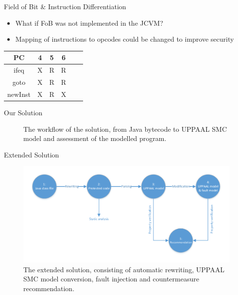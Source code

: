 \begin{frame}[fragile]{Field of Bit \& Instruction Differentiation}
\begin{itemize}
\item What if FoB was not implemented in the JCVM?
\item Mapping of instructions to opcodes could be changed to improve security
\end{itemize}
\begin{table}
\centering
\begin{tabular}{|c|c|c|c|c|c|}
\hline PC & 4 & 5 & 6   \\ 
\hline ifeq & X & R & R \\ 
\hline goto & X & R & R \\ 
\hline newInst & X & R & X \\ 
\hline 
\end{tabular} 
\end{table}
\end{frame}

\begin{frame}[fragile]{Our Solution}
\begin{center}
\begin{figure}
\def\svgwidth{\columnwidth}

\caption{The workflow of the solution, from Java bytecode to UPPAAL SMC model and assessment of the modelled program.}
\label{fig:workflow_new}
\end{figure}
\end{center}
\end{frame}


\begin{frame}[fragile]{Extended Solution}


\begin{figure}
\centering
\includegraphics[scale=0.65]{figures/workflow.pdf}
\caption{\footnotesize The extended solution, consisting of automatic rewriting, UPPAAL SMC model conversion, fault injection and countermeasure recommendation.}
\label{test}
\end{figure}
\end{frame}